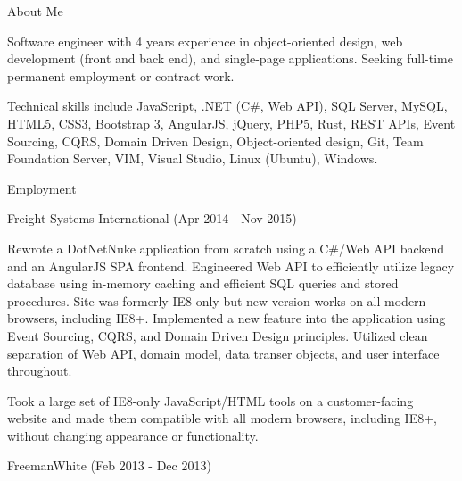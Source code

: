 \documentclass{article}
\begin{document}
    \bigskip\bigskip\bigskip


    {
        \noindent\Large
        About Me
    }

    \noindent\makebox[\linewidth]{\rule{\textwidth}{0.4pt}}
    \medskip

    Software engineer with 4 years experience in object-oriented design, web development (front and back end), and single-page applications. Seeking full-time permanent employment or contract work.

    \medskip

    Technical skills include JavaScript, .NET (C\#, Web API), SQL Server, MySQL, HTML5, CSS3, Bootstrap 3, AngularJS, jQuery, PHP5, Rust, REST APIs, Event Sourcing, CQRS, Domain Driven Design, Object-oriented design, Git, Team Foundation Server, VIM, Visual Studio, Linux (Ubuntu), Windows.

    
    \bigskip\bigskip\bigskip

    {
        \noindent\Large
        Employment
    }

    \noindent\makebox[\linewidth]{\rule{\textwidth}{0.4pt}}
    \medskip

    {
        \large
        Freight Systems International
        {
            \color{fade-gray}
            \small
            (Apr 2014 - Nov 2015)
        }
    }

    \medskip

    Rewrote a DotNetNuke application from scratch using a C\#/Web API backend and an AngularJS SPA frontend. Engineered Web API to efficiently utilize legacy database using in-memory caching and efficient SQL queries and stored procedures. Site was formerly IE8-only but new version works on all modern browsers, including IE8+. Implemented a new feature into the application using Event Sourcing, CQRS, and Domain Driven Design principles. Utilized clean separation of Web API, domain model, data transer objects, and user interface throughout.

    \smallskip

    Took a large set of IE8-only JavaScript/HTML tools on a customer-facing website and made them compatible with all modern browsers, including IE8+, without changing appearance or functionality.


    \bigskip\bigskip

    {
        \large
        FreemanWhite 
        {
            \color{fade-gray}
            \small
            (Feb 2013 - Dec 2013)
        }
    }

    \medskip
\end{document}
